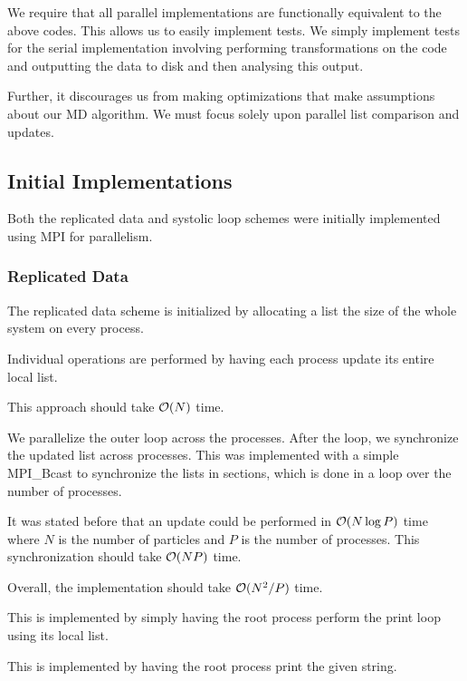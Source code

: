 We require that all parallel implementations are functionally equivalent
to the above codes.
%
This allows us to easily implement tests.
%
We simply implement tests for the serial implementation involving
performing transformations on the code and outputting the data to disk
and then analysing this output.

Further, it discourages us from making optimizations that make
assumptions about our MD algorithm.
%
We must focus solely upon parallel list comparison and updates.


\subsection{Initial Implementations}

Both the replicated data and systolic loop schemes were initially implemented
using MPI for parallelism.


\subsubsection{Replicated Data}

The replicated data scheme is initialized by allocating a list the
size of the whole system on every process.

\begin{description}[style=nextline]
\item[individual\_operation]
    Individual operations are performed by having each process update
    its entire local list.

    This approach should take $\mathcal{O}{(N)}$ time.

\item[pair\_operation]
    We parallelize the outer loop across the processes.
    After the loop, we synchronize the updated list across processes.
    This was implemented with a simple MPI\_Bcast to synchronize
    the lists in sections, which is done in a loop over the number
    of processes.

    It was stated before that an update could be performed in
    $\mathcal{O}{(N\log{P})}$ time
    where $N$ is the number of particles and $P$ is the number of
    processes.
    This synchronization should take $\mathcal{O}{(NP)}$ time.

    Overall, the implementation should take $\mathcal{O}{(N^2/P)}$ time.

\item[print\_particles]
    This is implemented by simply having the root process perform the
    print loop using its local list.

\item[print\_string]
    This is implemented by having the root process print the given string.

\end  {description}



